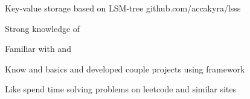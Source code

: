 \documentclass[]{cv-style}
\begin{document}
    \hspace*{0.7cm} {Key-value storage based on LSM-tree github.com/accakyra/lsss}

    \vspace{1cm}

    \hspace*{0.7cm} Strong knowledge of {}
    {\par}
    \hspace*{0.7cm} Familiar with {} and {}
    {\par}
    \hspace*{0.7cm} Know {} and {} basics
    and developed couple projects using { framework}
    {\par}
    \hspace*{0.7cm} Like spend time solving problems on leetcode and similar sites
\end{document}
